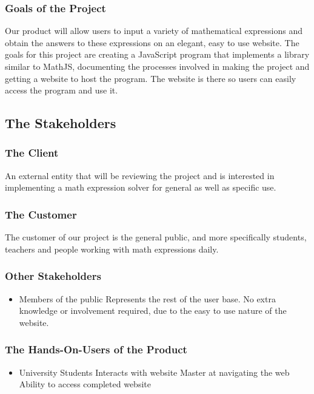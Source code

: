 \documentclass[11pt, oneside]{article}
\begin{document}
\subsubsection{Goals of the Project}
Our product will allow users to input a variety of mathematical expressions and obtain the answers to these expressions on an elegant, easy to use website. The goals for this project are creating a JavaScript program that implements a library similar to MathJS, documenting the processes involved in making the project and getting a website to host the program. The website is there so users can easily access the program and use it.


\subsection{The Stakeholders}
\subsubsection{The Client}
An external entity that will be reviewing the project and is interested in implementing a math expression solver for general as well as specific use.

\subsubsection{The Customer}
The customer of our project is the general public, and more specifically students, teachers and people working with math expressions daily.

\subsubsection{Other Stakeholders}
\begin{itemize}
\item Members of the public
\subitem Represents the rest of the user base. No extra knowledge or involvement required, due to the easy to use nature of the website.
\end{itemize}


\subsubsection{The Hands-On-Users of the Product}
\begin{itemize}
\item University Students
\subitem Interacts with website
\subitem Master at navigating the web
\subitem Ability to access completed website
\end{itemize}
\end{document}
